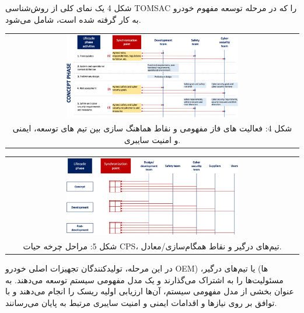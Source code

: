 \documentclass[a4paper,10pt]{article}
\begin{document}
            شکل 4 یک نمای کلی از روش‌شناسی TOMSAC را که در مرحله توسعه مفهوم خودرو به کار گرفته شده است، شامل می‌شود.

            \begin{table}
            
                \centering
                \begin{tabular}{ c }
                    
                    \includegraphics[width=0.6\textwidth]{Image/fig4.jpg} \\
    
                    شکل 4: فعالیت های فاز مفهومی و نقاط هماهنگ سازی بین تیم های توسعه، ایمنی و امنیت سایبری.
    
                \end{tabular}
    
            \end{table}
        
            \begin{table}
            
                \centering
                \begin{tabular}{ c }
                    
                    \includegraphics[width=0.6\textwidth]{Image/fig5.jpg} \\
    
                    شکل 5: مراحل چرخه حیات CPS، تیم‌های درگیر و نقاط همگام‌سازی/معادل.
    
                \end{tabular}
    
            \end{table}

            در این مرحله، تولیدکنندگان تجهیزات اصلی خودرو OEM) ها) یا تیم‌های درگیر، مسئولیت‌ها را به اشتراک می‌گذارند و یک مدل مفهومی سیستم توسعه می‌دهند. به عنوان بخشی از مدل مفهومی سیستم، آن‌ها ارزیابی اولیه ریسک را انجام می‌دهند و با توافق بر روی نیازها و اقدامات ایمنی و امنیت سایبری مرتبط به پایان می‌رسانند.
\end{document}
